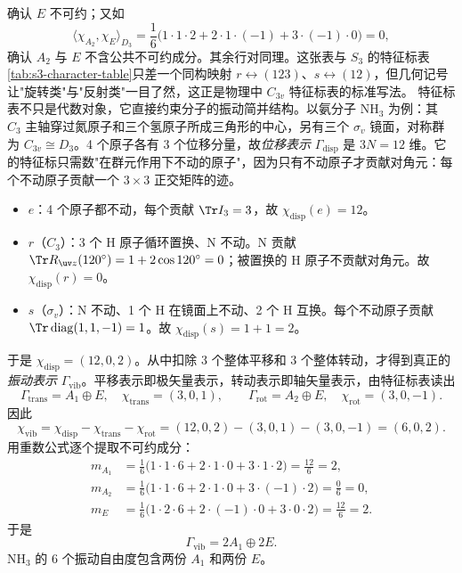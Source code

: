 确认 $E$ 不可约；又如
\[
\langle\chi_{A_2},\chi_E\rangle_{D_3}
=\frac{1}{6}\bigl(1\cdot1\cdot2+2\cdot1\cdot(-1)+3\cdot(-1)\cdot0\bigr)=0,
\]
确认 $A_2$ 与 $E$ 不含公共不可约成分。其余行对同理。这张表与 $S_3$ 的特征标表\cref{tab:s3-character-table}只差一个同构映射 $r\leftrightarrow(123)$、$s\leftrightarrow(12)$，但几何记号让"旋转类"与"反射类"一目了然，这正是物理中 $C_{3v}$ 特征标表的标准写法。
特征标表不只是代数对象，它直接约束分子的振动简并结构。以氨分子 $\mathrm{NH_3}$ 为例：其 $C_3$ 主轴穿过氮原子和三个氢原子所成三角形的中心，另有三个 $\sigma_v$ 镜面，对称群为 $C_{3v}\cong D_3$。4 个原子各有 3 个位移分量，故\emph{位移表示} $\Gamma_{\mathrm{disp}}$ 是 $3N=12$ 维。它的特征标只需数"在群元作用下不动的原子"，因为只有不动原子才贡献对角元：每个不动原子贡献一个 $3\times3$ 正交矩阵的迹。
\begin{itemize}[leftmargin=3em]
\item $e$：4 个原子都不动，每个贡献 $\Tr I_3=3$，故 $\chi_{\mathrm{disp}}(e)=12$。
\item $r$（$C_3$）：3 个 H 原子循环置换、N 不动。N 贡献 $\Tr R_{\uv z}(120^\circ)=1+2\cos120^\circ=0$；被置换的 H 原子不贡献对角元。故 $\chi_{\mathrm{disp}}(r)=0$。
\item $s$（$\sigma_v$）：N 不动、1 个 H 在镜面上不动、2 个 H 互换。每个不动原子贡献 $\Tr\operatorname{diag}(1,1,-1)=1$。故 $\chi_{\mathrm{disp}}(s)=1+1=2$。
\end{itemize}
于是 $\chi_{\mathrm{disp}}=(12,0,2)$。从中扣除 3 个整体平移和 3 个整体转动，才得到真正的\emph{振动表示} $\Gamma_{\mathrm{vib}}$。平移表示即极矢量表示，转动表示即轴矢量表示，由特征标表读出
\[
\Gamma_{\mathrm{trans}}=A_1\oplus E,\quad \chi_{\mathrm{trans}}=(3,0,1),
\qquad
\Gamma_{\mathrm{rot}}=A_2\oplus E,\quad \chi_{\mathrm{rot}}=(3,0,-1).
\]
因此
\[
\chi_{\mathrm{vib}}=\chi_{\mathrm{disp}}-\chi_{\mathrm{trans}}-\chi_{\mathrm{rot}}
=(12,0,2)-(3,0,1)-(3,0,-1)=(6,0,2).
\]
用重数公式逐个提取不可约成分：
\begin{align*}
m_{A_1}&=\tfrac16\bigl(1\cdot1\cdot6+2\cdot1\cdot0+3\cdot1\cdot2\bigr)=\tfrac{12}{6}=2,\\
m_{A_2}&=\tfrac16\bigl(1\cdot1\cdot6+2\cdot1\cdot0+3\cdot(-1)\cdot2\bigr)=\tfrac{0}{6}=0,\\
m_E&=\tfrac16\bigl(1\cdot2\cdot6+2\cdot(-1)\cdot0+3\cdot0\cdot2\bigr)=\tfrac{12}{6}=2.
\end{align*}
于是
\begin{equation}
\Gamma_{\mathrm{vib}}=2A_1\oplus 2E.
\label{eq:nh3-vib-decomposition}
\end{equation}
$\mathrm{NH_3}$ 的 6 个振动自由度包含两份 $A_1$ 和两份 $E$。

